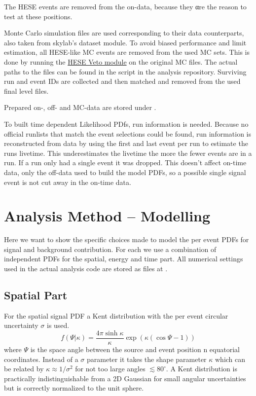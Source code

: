 The HESE events are removed from the on-data, because they αre the reason to test at these positions.

Monte Carlo simulation files are used corresponding to their data counterparts, also taken from skylab's dataset module.
To avoid biased performance and limit estimation, all HESE-like MC events are removed from the used MC sets.
This is done by running the \href{http://software.icecube.wisc.edu/documentation/projects/VHESelfVeto/index.html}{HESE Veto module} on the original MC  files.
The actual paths to the files can be found in the script  in the analysis repository.
Surviving run and event IDs are collected and then matched and removed from the used final level files.

Prepared on-, off- and MC-data are stored under .

To built time dependent Likelihood PDfs, run information is needed.
Because no official runlists that match the event selections could be found, run information is reconstructed from data by using the first and last event per run to estimate the runs livetime.
This underestimates the livetime the more the fewer events are in a run.
If a run only had a single event it was dropped.
This doesn't affect on-time data, only the off-data used to build the model PDFs, so a possible single signal event is not cut away in the on-time data.







\section{Analysis Method – Modelling}
Here we want to show the specific choices made to model the per event PDFs for signal and background contribution.
For each we use a combination of independent PDFs for the spatial, energy and time part.
All numerical settings used in the actual analysis code are stored as  files at .

\subsection{Spatial Part}
For the spatial signal PDF a Kent distribution with the per event circular uncertainty $\sigma$ is used.
\begin{equation}
  f(\Psi | \kappa) = \frac{4\pi\sinh\kappa}{\kappa}
    \exp\left(\kappa (\cos\Psi - 1)\right)
\end{equation}
where $\Psi$ is the space angle between the source and event position n equatorial coordinates.
Instead of a $\sigma$ parameter it takes the shape parameter $\kappa$ which can be related by $\kappa \approx 1 / \sigma^2$ for not too large angles $\lesssim 80^\circ$.
A Kent distribution is practically indistinguishable from a 2D Gaussian for small angular uncertainties but is correctly normalized to the unit sphere.

